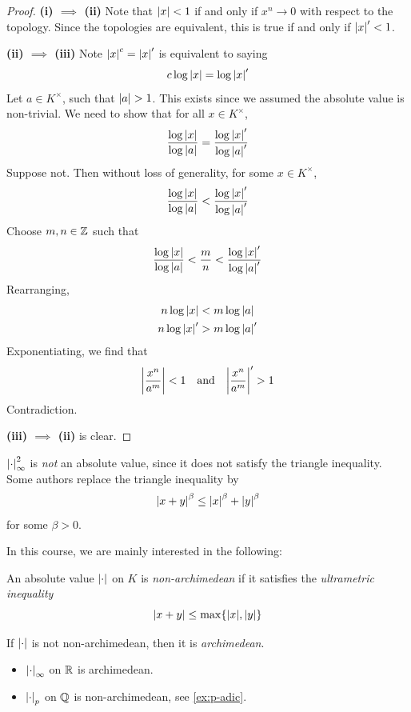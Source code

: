 \documentclass{article}
\begin{document}
\begin{proof}
    \textbf{(i) \(\implies\) (ii)} Note that \(\abs{x} < 1\) if and only if \(x^n \to 0\) with respect to the topology. Since the topologies are equivalent, this is true if and only if \(\abs{x}' < 1\).

    \textbf{(ii) \(\implies\) (iii)} Note \(\abs{x}^c = \abs{x}'\) is equivalent to saying
    \[c\log\abs{x} = \log\abs{x}'\]
    Let \(a \in K^\times\), such that \(\abs{a} > 1\). This exists since we assumed the absolute value is non-trivial. We need to show that for all \(x \in K^\times\),
    \[\frac{\log\abs{x}}{\log\abs{a}} = \frac{\log\abs{x}'}{\log\abs{a}'}\]
    Suppose not. Then without loss of generality, for some \(x \in K^\times\),
    \[\frac{\log\abs{x}}{\log\abs{a}} < \frac{\log\abs{x}'}{\log\abs{a}'}\]
    Choose \(m, n \in \mathbb{Z}\) such that
    \[\frac{\log\abs{x}}{\log\abs{a}} < \frac{m}{n} < \frac{\log\abs{x}'}{\log\abs{a}'}\]
    Rearranging,
    \begin{align*}
        n \log\abs{x} &< m \log\abs{a} \\
        n \log\abs{x}' &> m \log\abs{a}'
    \end{align*}
    Exponentiating, we find that
    \[\abs{\frac{x^n}{a^m}} < 1 \qqtext{and}\abs{\frac{x^n}{a^m}}' > 1\]
    Contradiction.

    \textbf{(iii) \(\implies\) (ii)} is clear.
\end{proof}

\begin{remark}
    \(\abs{\cdot}_\infty^2\) is \emph{not} an absolute value, since it does not satisfy the triangle inequality. Some authors replace the triangle inequality by
    \[\abs{x+y}^\beta \le \abs{x}^\beta + \abs{y}^\beta\]
    for some \(\beta > 0\).
\end{remark}

In this course, we are mainly interested in the following:

\begin{definition}
     An absolute value \(\abs{\cdot}\) on \(K\) is \emph{non-archimedean} if it satisfies the \emph{ultrametric inequality}
    \[\abs{x + y} \le \max\{\abs{x}, \abs{y}\}\]

    If \(\abs{\cdot}\) is not non-archimedean, then it is \emph{archimedean}.
\end{definition}

\begin{example}
    \begin{itemize}
        \item \(\abs{\cdot}_\infty\) on \(\mathbb{R}\) is archimedean.
        \item \(\abs{\cdot}_p\) on \(\mathbb{Q}\) is non-archimedean, see \cref{ex:p-adic}.
    \end{itemize}
\end{example}
\end{document}
